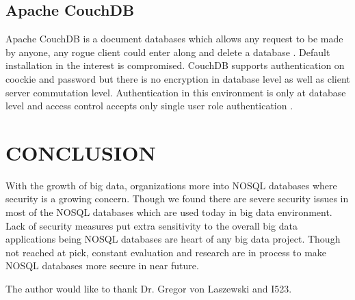 \subsection{Apache CouchDB}
Apache CouchDB is a document databases which allows any request to be made by anyone, any rogue client could enter along and delete a database \cite{editor06}. Default installation in the interest is compromised. CouchDB supports authentication on coockie and password but there is no encryption in database level as well as client server commutation level. Authentication in this environment is only at database level and access control accepts only single user role authentication \cite{editor06}.

\section{CONCLUSION}
With the growth of big data, organizations more into NOSQL databases where security is a growing concern. Though we found there are severe security issues in most of the NOSQL databases which are used today in big data environment. Lack of security measures put extra sensitivity to the overall big data applications being NOSQL databases are heart of any big data project. Though not reached at pick, constant evaluation and research are in process to make NOSQL databases more secure in near future. 

\begin{acks}

  The author would like to thank Dr. Gregor von Laszewski and I523.

\end{acks}



 


